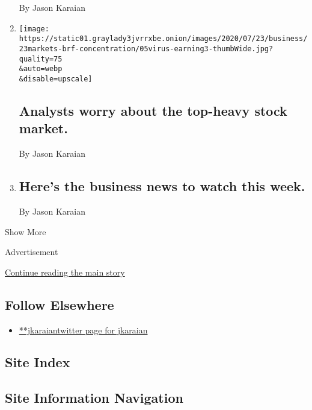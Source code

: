\begin{enumerate}
  By Jason Karaian
\item
  \href{/2020/07/23/business/analysts-worry-about-the-top-heavy-stock-market.html}{}

  \texttt{[image: https://static01.graylady3jvrrxbe.onion/images/2020/07/23/business/23markets-brf-concentration/05virus-earning3-thumbWide.jpg?quality=75\\\&auto=webp\\\&disable=upscale]}

  \hypertarget{analysts-worry-about-the-top-heavy-stock-market}{%
  \subsection{Analysts worry about the top-heavy stock
  market.}\label{analysts-worry-about-the-top-heavy-stock-market}}

  By Jason Karaian
\item
  \href{/2020/07/20/business/heres-the-business-news-to-watch-this-week.html}{}

  \hypertarget{heres-the-business-news-to-watch-this-week-2}{%
  \subsection{Here's the business news to watch this
  week.}\label{heres-the-business-news-to-watch-this-week-2}}

  By Jason Karaian
\end{enumerate}

Show More

Advertisement

\protect\hyperlink{after-mid2}{Continue reading the main story}

\hypertarget{follow-elsewhere}{%
\subsection{Follow Elsewhere}\label{follow-elsewhere}}

\begin{itemize}
\tightlist
\item
  \href{https://twitter.com/jkaraian}{**jkaraiantwitter page for
  jkaraian}
\end{itemize}

\hypertarget{site-index}{%
\subsection{Site Index}\label{site-index}}

\hypertarget{site-information-navigation}{%
\subsection{Site Information
Navigation}\label{site-information-navigation}}

